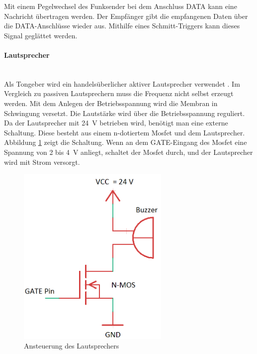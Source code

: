 Mit einem Pegelwechsel des Funksender bei dem Anschluss \si{DATA} kann eine Nachricht übertragen werden. Der Empfänger gibt die empfangenen Daten über die \si{DATA}-Anschlüsse wieder aus. Mithilfe eines Schmitt-Triggers kann dieses Signal geglättet werden.

\paragraph{Lautsprecher}\mbox{}\\
Als Tongeber wird ein handelsüberlicher aktiver Lautsprecher verwendet \cite{src_LAUTSPRECHER}. Im Vergleich zu passiven Lautsprechern muss die Frequenz nicht selbst erzeugt werden. Mit dem Anlegen der Betriebsspannung wird die Membran in Schwingung versetzt. Die Lautstärke wird über die Betriebsspannung reguliert. Da der Lautsprecher mit \SI{24}{\volt} betrieben wird, benötigt man eine externe Schaltung. Diese besteht aus einem n-dotiertem Mosfet und dem Lautsprecher. Abbildung \ref{img:schaltung} zeigt die Schaltung. Wenn an dem \si{GATE}-Eingang des Mosfet eine Spannung von \si{2} bis \SI{4}{\volt} anliegt, schaltet der Mosfet durch, und der Lautsprecher wird mit Strom versorgt.

\begin{figure}[H]
        \centering
		\hspace*{-1.5cm}
        \includegraphics[width=0.65\textwidth]{images/schaltung.png}
        \caption{Ansteuerung des Lautsprechers}
        \label{img:schaltung}
\end{figure}


